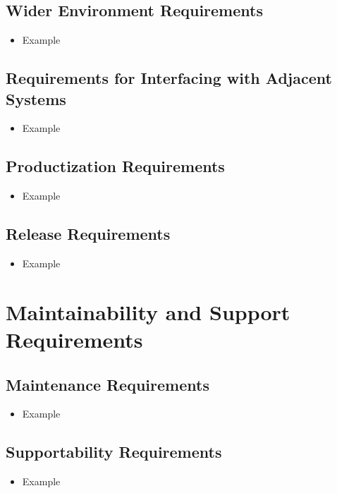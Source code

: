 \documentclass[12pt]{article}
\begin{document}
  \subsection{Wider Environment Requirements}
    \begin{itemize}
      \item Example
    \end{itemize}

  \subsection{Requirements for Interfacing with Adjacent Systems}
    \begin{itemize}
      \item Example
    \end{itemize}

  \subsection{Productization Requirements}
    \begin{itemize}
      \item Example
    \end{itemize}

  \subsection{Release Requirements}
    \begin{itemize}
      \item Example
    \end{itemize}

\section{Maintainability and Support Requirements}
  \subsection{Maintenance Requirements}
    \begin{itemize}
      \item Example
    \end{itemize}

  \subsection{Supportability Requirements}
    \begin{itemize}
      \item Example
    \end{itemize}
\end{document}
